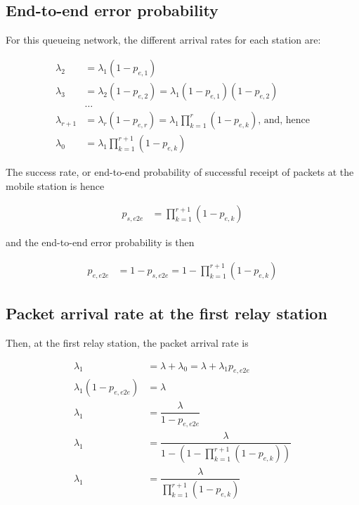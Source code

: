\subsection{End-to-end error probability}
For this queueing network, the different arrival rates for each station are:

\begin{align*}
  \lambda_2 &= \lambda_1 (1 - p_{e,1}) \\
  \lambda_3 &= \lambda_2 (1 - p_{e,2}) = \lambda_1 (1 - p_{e,1}) (1 - p_{e,2}) \\
  & \dots \\
  \lambda_{r+1} &= \lambda_r (1-p_{e,r}) = \lambda_1 \prod_{k=1}^{r} (1 - p_{e,k})
  \text{, and, hence} \\
  \lambda_0 &= \lambda_1 \prod_{k=1}^{r+1} (1 - p_{e,k})
\end{align*}

The success rate, or end-to-end probability of successful receipt of packets at
the mobile station is hence

\begin{align*}
  p_{s,e2e} &= \prod_{k=1}^{r+1} (1 - p_{e,k})
\end{align*}

and the end-to-end error probability is then

\begin{align*}
  p_{e,e2e} &= 1 - p_{s,e2e} = 1 - \prod_{k=1}^{r+1} (1 - p_{e,k})
\end{align*}


\subsection{Packet arrival rate at the first relay station}

Then, at the first relay station, the packet arrival rate is

\begin{align*}
  \lambda_1 &= \lambda + \lambda_0 = \lambda + \lambda_1 p_{e,e2e} \\
  \lambda_1 (1-p_{e,e2e}) &= \lambda  \\
  \lambda_1 &= \dfrac{\lambda}{1-p_{e,e2e}} \\
  \lambda_1 &= \dfrac{\lambda}{1 - (1 - \prod\limits_{k=1}^{r+1} (1 - p_{e,k}))} \\
  \lambda_1 &= \dfrac{\lambda}{\prod\limits_{k=1}^{r+1} (1 - p_{e,k})}
\end{align*}


